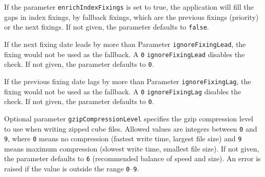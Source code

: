 \medskip If the parameter {\tt enrichIndexFixings} is set to true, the application will fill the gaps in index fixings,
by fallback fixings, which are the previous fixings (priority) or the next fixings.
If not given, the parameter defaults to {\tt false}.

\medskip If the next fixing date leads by more than Parameter {\tt ignoreFixingLead}, the fixing would not be used as the fallback.
A {\tt 0} {\tt ignoreFixingLead} disables the check.
If not given, the parameter defaults to {\tt 0}.

\medskip If the previous fixing date lags by more than Parameter {\tt ignoreFixingLag}, the fixing would not be used as the fallback.
A {\tt 0} {\tt ignoreFixingLag} disables the check.
If not given, the parameter defaults to {\tt 0}.

\medskip Optional parameter {\tt gzipCompressionLevel} specifies the gzip compression level to use when writing zipped cube files. Allowed values are integers between {\tt 0} and {\tt 9}, where {\tt 0} means no compression (fastest write time, largest file size) and {\tt 9} means maximum compression (slowest write time, smallest file size). If not given, the parameter defaults to {\tt 6} (recommended balance of speed and size). An error is raised if the value is outside the range {\tt 0}--{\tt 9}.

